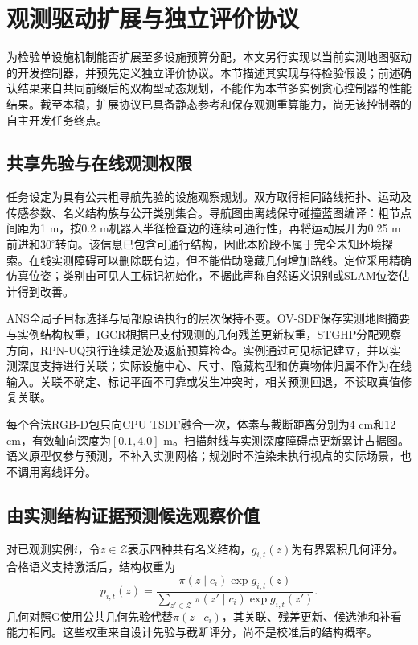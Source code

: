 \section{观测驱动扩展与独立评价协议}
\label{sec:observed_extension}

为检验单设施机制能否扩展至多设施预算分配，本文另行实现以当前实测地图驱动的开发控制器，并预先定义独立评价协议。本节描述其实现与待检验假设；前述确认结果来自共同前缀后的双构型动态规划，不能作为本节多实例贪心控制器的性能结果。截至本稿，扩展协议已具备静态参考和保存观测重算能力，尚无该控制器的自主开发任务终点。

\subsection{共享先验与在线观测权限}
任务设定为具有公共粗导航先验的设施观察规划。双方取得相同路线拓扑、运动及传感参数、名义结构族与公开类别集合。导航图由离线保守碰撞蓝图编译：粗节点间距为1 m，按0.2 m机器人半径检查边的连续可通行性，再将运动展开为0.25 m前进和$30^\circ$转向。该信息已包含可通行结构，因此本阶段不属于完全未知环境探索。在线实测障碍可以删除既有边，但不能借助隐藏几何增加路线。定位采用精确仿真位姿；类别由可见人工标记初始化，不据此声称自然语义识别或SLAM位姿估计得到改善。

ANS全局子目标选择与局部原语执行的层次保持不变。OV-SDF保存实测地图摘要与实例结构权重，IGCR根据已支付观测的几何残差更新权重，STGHP分配观察方向，RPN-UQ执行连续足迹及返航预算检查。实例通过可见标记建立，并以实测深度支持进行关联；实际设施中心、尺寸、隐藏构型和仿真物体归属不作为在线输入。关联不确定、标记平面不可靠或发生冲突时，相关预测回退，不读取真值修复关联。

每个合法RGB-D包只向CPU TSDF融合一次，体素与截断距离分别为4 cm和12 cm，有效轴向深度为$[0.1,4.0]$ m。扫描射线与实测深度障碍点更新累计占据图。语义原型仅参与预测，不补入实测网格；规划时不渲染未执行视点的实际场景，也不调用离线评分。

\subsection{由实测结构证据预测候选观察价值}
对已观测实例$i$，令$z\in\mathcal Z$表示四种共有名义结构，$g_{i,t}(z)$为有界累积几何评分。合格语义支持激活后，结构权重为
\begin{equation}
 p_{i,t}(z)=\frac{\pi(z\mid c_i)\exp g_{i,t}(z)}
 {\sum_{z'\in\mathcal Z}\pi(z'\mid c_i)\exp g_{i,t}(z')}.
 \label{eq:extension-belief}
\end{equation}
几何对照G使用公共几何先验代替$\pi(z\mid c_i)$，其关联、残差更新、候选池和补看能力相同。这些权重来自设计先验与截断评分，尚不是校准后的结构概率。

